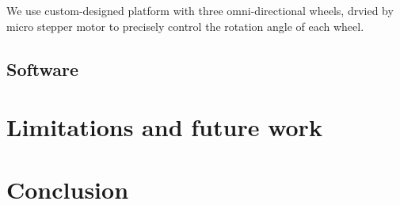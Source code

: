 \documentclass[conference]{IEEEtran}
\begin{document}
We use custom-designed platform with three omni-directional wheels, drvied by micro stepper motor to precisely control the rotation angle of each wheel.


\subsection{Software}

\section{Limitations and future work}

\section{Conclusion}






\end{document}
